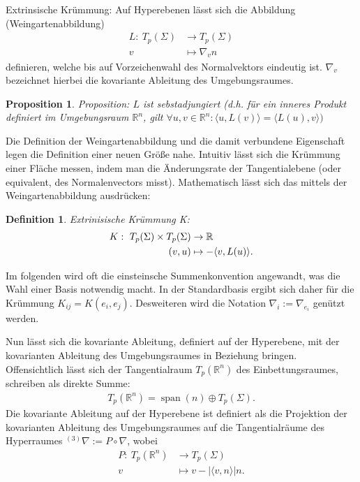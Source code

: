 \documentclass{scrartcl}
\newtheorem{definition}{Definition}
\newtheorem{proposition}{Proposition}
\newcommand{\inHS}{{}^{(3)}\!}
\begin{document}
		\begin{paragraph}{Extrinsische Krümmung:}
		Auf Hyperebenen lässt sich die Abbildung (Weingartenabbildung)
		\begin{align*}
			L:\ T_p(\Sigma)&\rightarrow T_p(\Sigma) \\
				v&\mapsto \nabla_v n
		\end{align*}
		definieren, welche bis auf Vorzeichenwahl des Normalvektors eindeutig ist. $\nabla_v$ bezeichnet hierbei die kovariante Ableitung 
		des Umgebungsraumes.
		\begin{proposition}{Proposition:} $L$ ist sebstadjungiert (d.h. für ein inneres Produkt definiert im Umgebungsraum $\mathbb{R}^n$, gilt 
			$\forall u,v\in \mathbb{R}^n:\langle u,L(v)\rangle=\langle L(u),v\rangle)$ 
		\end{proposition}
		Die Definition der Weingartenabbildung und die damit verbundene Eigenschaft legen die Definition einer neuen Größe nahe.
		Intuitiv lässt sich die Krümmung einer Fläche messen, indem man die Änderungsrate der Tangentialebene (oder equivalent, des Normalenvectors misst).
		Mathematisch lässt sich das mittels der Weingartenabbildung ausdrücken:
		\begin{definition} Extrinisische Krümmung K:
			\begin{align}
				K:\ T_p(\Sigma)\times T_p(\Sigma)&\rightarrow \mathbb{R} \label{def:extrcurv} \\
					(v,u)&\mapsto -\langle v,L(u)\rangle.\notag
			\end{align}
		\end{definition}
		Im folgenden wird oft die einsteinsche Summenkonvention angewandt, was die Wahl einer Basis notwendig macht. In der Standardbasis
		ergibt sich daher für die Krümmung $K_{ij}=K(e_i,e_j)$. Desweiteren wird die Notation $\nabla_i:=\nabla_{e_i}$ genützt werden.

		Nun lässt sich die kovariante Ableitung, definiert auf der Hyperebene, mit der kovarianten Ableitung des Umgebungsraumes in Beziehung bringen.
		Offensichtlich lässt sich der Tangentialraum $T_p(\mathbb{R}^n)$ des Einbettungsraumes, schreiben als direkte Summe:
		\begin{align}
			T_p(\mathbb{R}^n) = \operatorname{span}(n)\oplus T_p(\Sigma).
		\end{align}
		Die kovariante Ableitung auf der Hyperebene ist definiert als die Projektion der kovarianten Ableitung des Umgebungsraumes auf die Tangentialräume
		des Hyperraumes $\inHS\nabla:=P\circ \nabla$, wobei
		\begin{align*}
			P:\ T_p(\mathbb{R}^n)&\rightarrow T_p(\Sigma)\\
				v&\mapsto v-|\langle v,n\rangle| n.
		\end{align*}
		

\end{paragraph}
\end{document}
